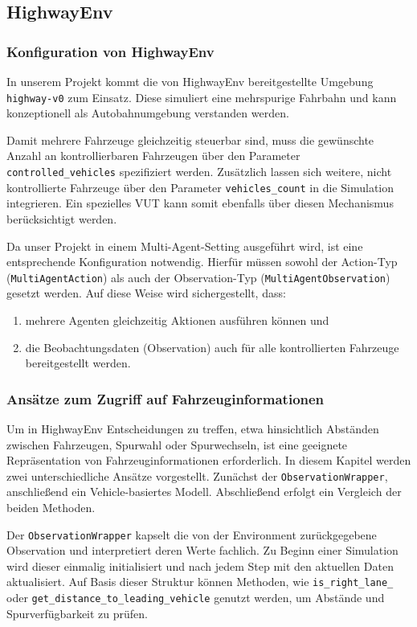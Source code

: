 \subsection{HighwayEnv}
\subsubsection{Konfiguration von HighwayEnv}
In unserem Projekt kommt die von HighwayEnv bereitgestellte Umgebung \texttt{highway-v0} zum Einsatz. Diese simuliert eine mehrspurige Fahrbahn und kann konzeptionell als Autobahnumgebung verstanden werden. 

Damit mehrere Fahrzeuge gleichzeitig steuerbar sind, muss die gewünschte Anzahl an kontrollierbaren Fahrzeugen über den Parameter \texttt{controlled\_vehicles} spezifiziert werden. Zusätzlich lassen sich weitere, nicht kontrollierte Fahrzeuge über den Parameter \texttt{vehicles\_count} in die Simulation integrieren. Ein spezielles VUT kann somit ebenfalls über diesen Mechanismus berücksichtigt werden.

Da unser Projekt in einem Multi-Agent-Setting ausgeführt wird, ist eine entsprechende Konfiguration notwendig. Hierfür müssen sowohl der Action-Typ (\texttt{MultiAgentAction}) als auch der Observation-Typ (\texttt{MultiAgentObservation}) gesetzt werden. Auf diese Weise wird sichergestellt, dass:
\begin{enumerate}
    \item mehrere Agenten gleichzeitig Aktionen ausführen können und
    \item die Beobachtungsdaten (Observation) auch für alle kontrollierten Fahrzeuge bereitgestellt werden.
\end{enumerate}

\subsubsection{Ansätze zum Zugriff auf Fahrzeuginformationen}
\label{sec:get_vehicle_info}
Um in HighwayEnv Entscheidungen zu treffen, etwa hinsichtlich Abständen zwischen Fahrzeugen, Spurwahl oder Spurwechseln, ist eine geeignete Repräsentation von Fahrzeuginformationen erforderlich. In diesem Kapitel werden zwei unterschiedliche Ansätze vorgestellt. Zunächst der \texttt{ObservationWrapper}, anschließend ein Vehicle-basiertes Modell. Abschließend erfolgt ein Vergleich der beiden Methoden.

Der \texttt{ObservationWrapper} kapselt die von der Environment zurückgegebene Observation und interpretiert deren Werte fachlich. Zu Beginn einer Simulation wird dieser einmalig initialisiert und nach jedem Step mit den aktuellen Daten aktualisiert. Auf Basis dieser Struktur können Methoden, wie \texttt{is\_right\_lane\_} oder \texttt{get\_distance\_to\_leading\_vehicle} genutzt werden, um Abstände und Spurverfügbarkeit zu prüfen.

